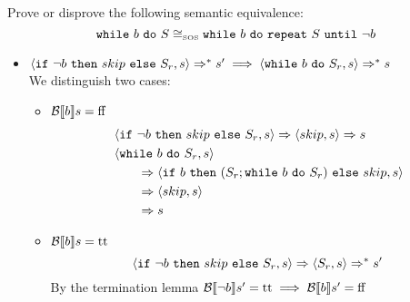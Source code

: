 \begin{exercise}{
    Prove or disprove the following semantic equivalence:
    \[ \texttt{while}\ b\ \texttt{do}\ S \cong_{\text{\tiny SOS}} \texttt{while}\ b\ \texttt{do}\ \texttt{repeat}\ S\ \texttt{until}\ \neg b  \]\vspace*{-0.6cm}
}
\begin{itemize}
\begin{itemize}
\begin{itemize}
\begin{gather*}
                    \end{gather*}
                    Then
                    \begin{align*}
                        &\instr{\wwhile{b}{S}}{s}
                        \\&\qquad\Rightarrow \instr{\wif{b}{(S; \wwhile{b}{S})}{skip}}{s}
                        \\&\qquad\Rightarrow \instr{S; \wwhile{b}{S}}{s}
                        \qquad\qquad\qquad\text{(By the composition lemma)}
                        \\&\qquad\Rightarrow^* \instr{\wwhile{b}{S}}{s''}
                    \end{align*}
                    And since $\instr{\wif{\neg b}{skip}{S_r}}{s''} \Rightarrow^{k_2} s'$ and $k_2 = k - 1 - k_1 \leq k$  we can apply the inductive hypothesis and get:
                    \[ \instr{\wwhile{b}{S}}{s''} \Rightarrow s' \]
                \end{itemize}
            \end{itemize}
        \item $\left<\texttt{if}\ \neg b\ \texttt{then}\ skip\ \texttt{else}\ S_r, s\right> \Rightarrow^* s' \implies \left<\texttt{while}\ b\ \texttt{do}\ S_r, s\right> \Rightarrow^* s$ \\
            We distinguish two cases:
            \begin{itemize}
                \item $\mathcal{B} \llbracket b \rrbracket s = \text{ff}$
                \begin{align*}
                    &\left<\texttt{if}\ \neg b\ \texttt{then}\ skip\ \texttt{else}\ S_r, s\right>
                    \Rightarrow
                    \left<skip, s\right>
                    \Rightarrow s
                    \\
                    &\left<\texttt{while}\ b\ \texttt{do}\ S_r, s\right>
                    \\&\qquad\Rightarrow \left<\texttt{if}\ b\ \texttt{then}\ (S_r; \texttt{while}\ b\ \texttt{do}\ S_r)\ \texttt{else}\ skip, s\right>
                    \\&\qquad\Rightarrow \left<skip, s\right>
                    \\&\qquad\Rightarrow s
                \end{align*}
                \item $\mathcal{B} \llbracket b \rrbracket s = \text{tt}$
                \[
                    \left<\texttt{if}\ \neg b\ \texttt{then}\ skip\ \texttt{else}\ S_r, s\right>
                    \Rightarrow
                    \left<S_r, s\right>
                    \Rightarrow^* s'
                \]
                By the termination lemma $\mathcal{B} \llbracket \neg b \rrbracket s' = \text{tt} \implies \mathcal{B} \llbracket b \rrbracket s' = \text{ff}$

\end{itemize}
\end{itemize}
\end{exercise}
